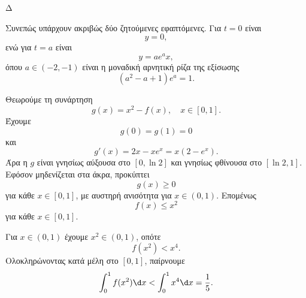 \begin{thema}{Δ}
\begin{erwthma}
Συνεπώς υπάρχουν ακριβώς δύο ζητούμενες εφαπτόμενες. Για $t=0$ είναι
\[
{y=0},
\]
ενώ για $t=a$ είναι
\[
{y=ae^a x},
\]
όπου $a\in(-2,-1)$ είναι η μοναδική αρνητική ρίζα της εξίσωσης
\[
(a^2-a+1)e^a=1.
\]

\item Θεωρούμε τη συνάρτηση
\[
g(x)=x^2-f(x),\quad x\in[0,1].
\]
Έχουμε
\[
g(0)=g(1)=0
\]
και
\[
g'(x)=2x-xe^x=x(2-e^x).
\]
Άρα η $g$ είναι γνησίως αύξουσα στο $[0,\ln2]$ και γνησίως φθίνουσα στο $[\ln2,1]$. Εφόσον μηδενίζεται στα άκρα, προκύπτει
\[
g(x)\geq0
\]
για κάθε $x\in[0,1]$, με αυστηρή ανισότητα για $x\in(0,1)$. Επομένως
\[
{f(x)\leq x^2}
\]
για κάθε $x\in[0,1]$.

Για $x\in(0,1)$ έχουμε $x^2\in(0,1)$, οπότε
\[
f(x^2)<x^4.
\]
Ολοκληρώνοντας κατά μέλη στο $[0,1]$, παίρνουμε
\[
\int_0^1f(x^2)\d x
<\int_0^1x^4\d x
={\frac{1}{5}}.
\]
\end{erwthma}
\end{thema}

